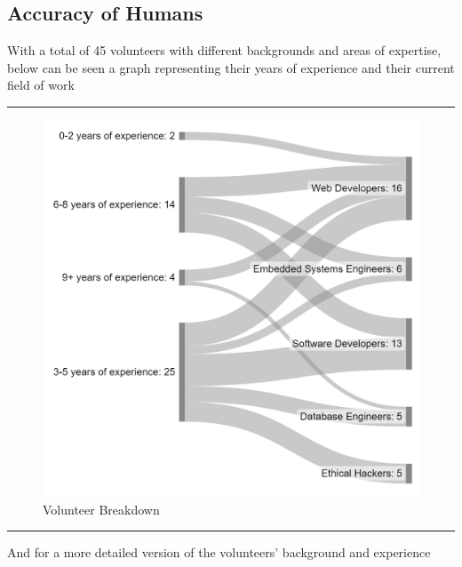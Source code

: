 \subsection{Accuracy of Humans}\label{humanacc}
\begin{center}
    With a total of 45 volunteers with different backgrounds and areas of expertise, below can be seen a graph representing their years of experience and their current field of work
\end{center}






\hrule    
\begin{figure}[H]
    \centering
    \caption{Volunteer Breakdown}
    \includegraphics[scale=0.25]{./Images/breakdown.png}
\end{figure}
\hrule

\begin{center}
    And for a more detailed version of the volunteers' background and experience
\end{center}


